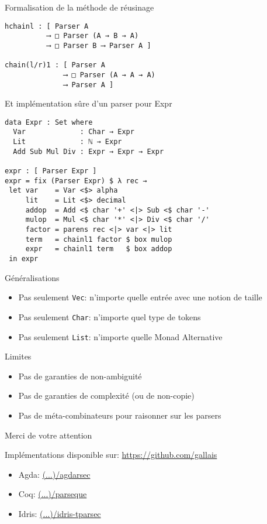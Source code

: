 \documentclass{beamer}
\begin{document}
\begin{frame}[fragile]{Formalisation de la méthode de réusinage}
\begin{verbatim}
hchainl : [ Parser A
          ⟶ □ Parser (A → B → A)
          ⟶ □ Parser B ⟶ Parser A ]

chain(l/r)1 : [ Parser A
              ⟶ □ Parser (A → A → A)
              ⟶ Parser A ]
\end{verbatim}
\end{frame}

\begin{frame}[fragile]{Et implémentation sûre d'un parser pour Expr}
\begin{verbatim}
data Expr : Set where
  Var             : Char → Expr
  Lit             : ℕ → Expr
  Add Sub Mul Div : Expr → Expr → Expr

expr : [ Parser Expr ]
expr = fix (Parser Expr) $ λ rec →
 let var    = Var <$> alpha
     lit    = Lit <$> decimal
     addop  = Add <$ char '+' <|> Sub <$ char '-'
     mulop  = Mul <$ char '*' <|> Div <$ char '/'
     factor = parens rec <|> var <|> lit
     term   = chainl1 factor $ box mulop
     expr   = chainl1 term   $ box addop
 in expr
\end{verbatim}
\end{frame}

\begin{frame}{Généralisations}
\begin{itemize}
  \item Pas seulement \texttt{Vec}: n'importe quelle entrée avec une notion de taille
  \item Pas seulement \texttt{Char}: n'importe quel type de tokens
  \item Pas seulement \texttt{List}: n'importe quelle Monad Alternative
\end{itemize}
\end{frame}

\begin{frame}{Limites}
\begin{itemize}
  \item Pas de garanties de non-ambiguité
  \item Pas de garanties de complexité (ou de non-copie)
  \item Pas de méta-combinateurs pour raisonner sur les parsers
\end{itemize}
\end{frame}

\begin{frame}[fragile]{Merci de votre attention}

Implémentations disponible sur: \url{https://github.com/gallais}
\begin{itemize}
  \item Agda: \url{(...)/agdarsec}
  \item Coq: \url{(...)/parseque}
  \item Idris: \url{(...)/idris-tparsec}
\end{itemize}
\end{frame}
\end{document}
